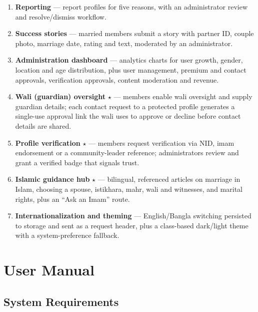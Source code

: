 \documentclass[12pt,a4paper]{report}
\begin{document}
\begin{enumerate}
  \item \textbf{Reporting} --- report profiles for five reasons, with an
        administrator review and resolve/dismiss workflow.
  \item \textbf{Success stories} --- married members submit a story with partner
        ID, couple photo, marriage date, rating and text, moderated by an
        administrator.
  \item \textbf{Administration dashboard} --- analytics charts for user growth,
        gender, location and age distribution, plus user management, premium and
        contact approvals, verification approvals, content moderation and revenue.
  \item \textbf{Wali (guardian) oversight} $\star$ --- members enable wali
        oversight and supply guardian details; each contact request to a
        protected profile generates a single-use approval link the wali uses to
        approve or decline before contact details are shared.
  \item \textbf{Profile verification} $\star$ --- members request
        verification via NID, imam endorsement or a community-leader reference;
        administrators review and grant a verified badge that signals trust.
  \item \textbf{Islamic guidance hub} $\star$ --- bilingual, referenced
        articles on marriage in Islam, choosing a spouse, istikhara, mahr, wali
        and witnesses, and marital rights, plus an ``Ask an Imam'' route.
  \item \textbf{Internationalization and theming} --- English/Bangla switching
        persisted to storage and sent as a request header, plus a class-based
        dark/light theme with a system-preference fallback.
\end{enumerate}

\chapter{User Manual}

\section{System Requirements}
\end{document}
